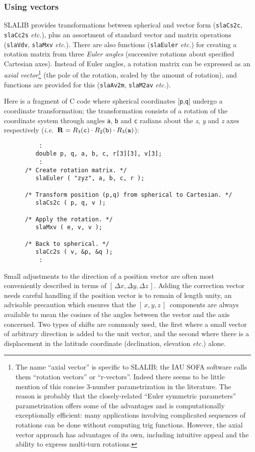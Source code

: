 \documentclass[11pt,fleqn,twoside]{article}
\renewcommand{\_}{{\tt\char'137}}     %
\newcommand{\xyz}       {$[\,x,y,z\,]$}
\begin{document}
\subsubsection{Using vectors}
SLALIB provides transformations between spherical and vector
form
({\tt slaCs2c},
{\tt slaCc2s}
{\it etc.}), plus an assortment
of standard vector and matrix operations
({\tt slaVdv},
{\tt slaMxv}
{\it etc.}).
There are also functions
({\tt slaEuler}
{\it etc.}) for creating a rotation matrix
from three {\it Euler angles}\/ (successive rotations about
specified Cartesian axes).  Instead of Euler angles, a rotation
matrix can be expressed as an {\it axial vector}\/\footnote{The
name ``axial vector'' is specific to SLALIB;  the IAU SOFA
software calls them ``rotation vectors'' or ``r-vectors''.  Indeed
there seems to be little mention of this concise 3-number
parametrization in the literature.
The reason is probably that the closely-related ``Euler symmetric
parameters'' parametrization offers some of the advantages and
is computationally exceptionally efficient:  many applications
involving complicated sequences of rotations can be done
without computing trig functions.  However, the axial vector
approach has advantages of its own, including intuitive appeal and the
ability to express multi-turn rotations.} (the pole of the rotation,
scaled by the amount of rotation), and functions are provided for this
({\tt slaAv2m},
{\tt slaM2av}
{\it etc.}).

Here is a fragment of C code
where spherical coordinates [{\tt p},{\tt q}]
undergo a coordinate transformation;
the transformation consists of a rotation of the coordinate system
through angles {\tt a}, {\tt b} and {\tt c} radians about the
{\it z}, {\it y}\/ and {\it z}\/ axes respectively
({\it i.e.}~${\bf R}=R_3({\tt c}) \cdot R_2({\tt b}) \cdot R_3({\tt a})$):
\goodbreak
\vspace{-3ex}
\begin{verbatim}
          :
         double p, q, a, b, c, r[3][3], v[3];
          :
      /* Create rotation matrix. */
         slaEuler ( "zyz", a, b, c, r );
 
      /* Transform position (p,q) from spherical to Cartesian. */
         slaCs2c ( p, q, v );
 
      /* Apply the rotation. */
         slaMxv ( e, v, v );
 
      /* Back to spherical. */
         slaCc2s ( v, &p, &q );
          :
\end{verbatim}
\vspace{-3ex}
\goodbreak
Small adjustments to the direction of a position
vector are often most conveniently described in terms of
$[\,\Delta x,\Delta y, \Delta z\,]$.  Adding the correction
vector needs careful handling if the position
vector is to remain of length unity, an advisable precaution which
ensures that
the \xyz\ components are always available to mean the cosines of
the angles between the vector and the axis concerned.  Two types
of shifts are commonly used,
the first where a small vector of arbitrary direction is
added to the unit vector, and the second where there is a displacement
in the latitude coordinate (declination, elevation {\it etc.}) alone.
 
\end{document}
